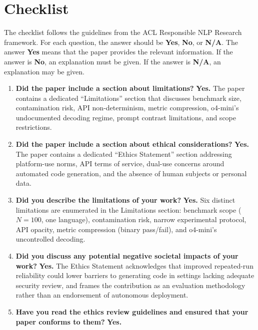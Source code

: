 \documentclass[11pt,a4paper]{article}
\begin{document}
\section*{Checklist}

The checklist follows the guidelines from the ACL Responsible NLP Research
framework. For each question, the answer should be \textbf{Yes}, \textbf{No},
or \textbf{N/A}. The answer \textbf{Yes} means that the paper
provides the relevant information. If the answer is \textbf{No}, an
explanation must be given. If the answer is \textbf{N/A}, an explanation
may be given.

\begin{enumerate}

\item \textbf{Did the paper include a section about limitations?}
  \textbf{Yes.} The paper contains a dedicated ``Limitations'' section
  that discusses benchmark size, contamination risk, API
  non-determinism, metric compression, o4-mini's undocumented decoding
  regime, prompt contrast limitations, and scope restrictions.

\item \textbf{Did the paper include a section about ethical
  considerations?}
  \textbf{Yes.} The paper contains a dedicated ``Ethics Statement''
  section addressing platform-use norms, API terms of service,
  dual-use concerns around automated code generation, and the absence
  of human subjects or personal data.

\item \textbf{Did you describe the limitations of your work?}
  \textbf{Yes.} Six distinct limitations are enumerated in the
  Limitations section: benchmark scope ($N=100$, one language),
  contamination risk, narrow experimental protocol, API opacity,
  metric compression (binary pass/fail), and o4-mini's uncontrolled
  decoding.

\item \textbf{Did you discuss any potential negative societal impacts
  of your work?}
  \textbf{Yes.} The Ethics Statement acknowledges that improved
  repeated-run reliability could lower barriers to generating code in
  settings lacking adequate security review, and frames the contribution
  as an evaluation methodology rather than an endorsement of autonomous
  deployment.

\item \textbf{Have you read the ethics review guidelines and ensured
  that your paper conforms to them?}
  \textbf{Yes.}

\end{enumerate}
\end{document}
